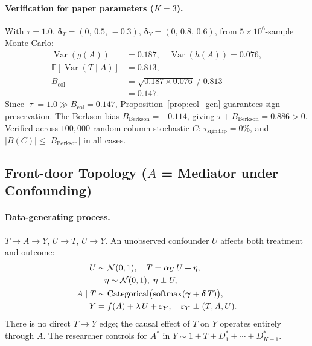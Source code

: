 \paragraph{Verification for paper parameters ($K{=}3$).}
With $\tau{=}1.0$, $\boldsymbol{\delta}_T{=}(0,\,0.5,\,{-}0.3)$, $\boldsymbol{\delta}_Y{=}(0,\,0.8,\,0.6)$, from $5{\times}10^6$-sample Monte Carlo:
\begin{align*}
  \operatorname{Var}(g(A)) &= 0.187,\quad
  \operatorname{Var}(h(A)) = 0.076,\\
  \mathbb{E}[\operatorname{Var}(T\mid A)] &= 0.813,\\
  \bar{B}_{\mathrm{col}} &= \sqrt{0.187\times 0.076}\;/\;0.813\\
  &= 0.147.
\end{align*}
Since $|\tau|{=}1.0\gg\bar{B}_{\mathrm{col}}{=}0.147$, Proposition~\ref{prop:col_gen} guarantees sign preservation.
The Berkson bias $B_{\mathrm{Berkson}}{=}{-}0.114$, giving $\tau+B_{\mathrm{Berkson}}{=}0.886{>}0$.
Verified across $100{,}000$ random column-stochastic $C$: $\tau_{\mathrm{sign\,flip}}{=}0\%$, and $|B(C)|\leq|B_{\mathrm{Berkson}}|$ in all cases.

\subsection{Front-door Topology ($A$ = Mediator under Confounding)}
\label{app:frontdoor}

\paragraph{Data-generating process.}
$T\to A\to Y$, $U\to T$, $U\to Y$.
An unobserved confounder $U$ affects both treatment and outcome:
\begin{align*}
  U &\sim \mathcal{N}(0,1),\quad
  T = \alpha_U\,U + \eta,\\
  &\quad \eta\sim\mathcal{N}(0,1),\;\eta\perp U,\notag\\
  A\mid T &\sim \operatorname{Categorical}\bigl(\operatorname{softmax}(\boldsymbol{\gamma}+\boldsymbol{\delta}\,T)\bigr),\\
  Y &= f(A) + \lambda\,U + \varepsilon_Y,\quad \varepsilon_Y\perp(T,A,U).
\end{align*}
There is no direct $T{\to}Y$ edge; the causal effect of $T$ on $Y$ operates entirely through $A$.
The researcher controls for $A^*$ in $Y\sim 1+T+D_1^*+\cdots+D_{K-1}^*$.

